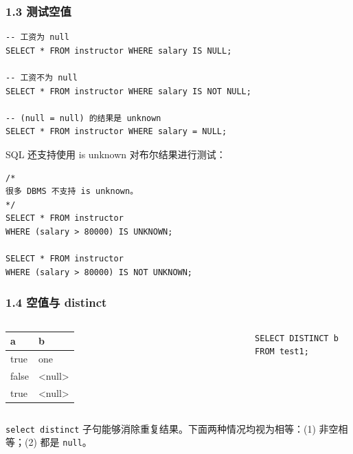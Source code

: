 \documentclass[aspectratio=169, 14pt]{beamer}
\begin{document}
\begin{frame}[fragile]
	\frametitle{1.3 测试空值}

	\begin{verbatim}
-- 工资为 null
SELECT * FROM instructor WHERE salary IS NULL;

-- 工资不为 null
SELECT * FROM instructor WHERE salary IS NOT NULL;

-- (null = null) 的结果是 unknown
SELECT * FROM instructor WHERE salary = NULL;
    \end{verbatim}

\end{frame}

\begin{frame}[fragile]
	SQL 还支持使用 \alert{is unknown} 对布尔结果进行测试：

	\begin{verbatim}
/*
很多 DBMS 不支持 is unknown。
*/
SELECT * FROM instructor
WHERE (salary > 80000) IS UNKNOWN;

SELECT * FROM instructor
WHERE (salary > 80000) IS NOT UNKNOWN;
\end{verbatim}

\end{frame}

\begin{frame}[fragile]
	\frametitle{1.4 空值与 distinct}
	\begin{columns}
		\begin{table}
			\begin{tabular}{ll}
				\toprule
				a     & b      \\
				\midrule
				true  & one    \\
				false & <null> \\
				true  & <null> \\
				\bottomrule
			\end{tabular}
		\end{table}
		\begin{verbatim}
SELECT DISTINCT b FROM test1;
        \end{verbatim}
	\end{columns}

	\pause
	\texttt{select distinct} 子句能够消除重复结果。下面两种情况均视为相等：(1) 非空相等；(2) 都是 \texttt{null}。

\end{frame}
\end{document}
